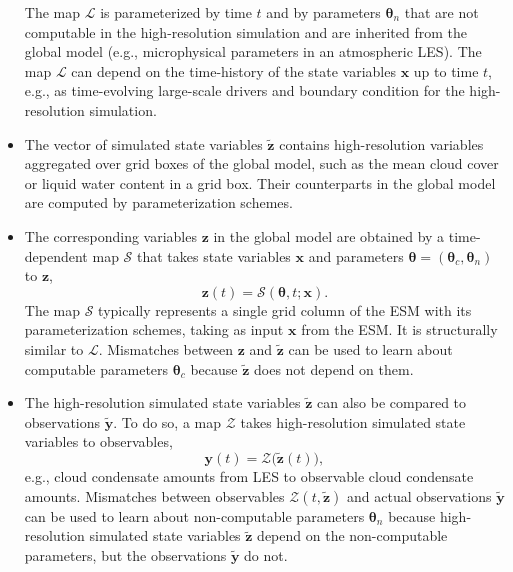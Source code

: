 \documentclass{article}
\renewcommand{\vec}[1]{\boldsymbol{{#1}}}
\begin{document}
\begin{itemize}
\begin{equation}
    \end{equation}
    The map $\mathcal{L}$ is parameterized by time $t$ and by parameters $\vec{\theta}_n$ that are not computable in the high-resolution simulation and are inherited from the global model (e.g., microphysical parameters in an atmospheric LES). The map $\mathcal{L}$ can depend on the time-history of the state variables $\vec{x}$ up to time $t$, e.g., as time-evolving large-scale drivers and boundary condition for the high-resolution simulation. 
    \item The vector of simulated state variables $\vec{\tilde z}$ contains high-resolution variables aggregated over grid boxes of the global model,  such as the mean cloud cover or liquid water content in a grid box. Their counterparts in the global model are computed by parameterization schemes.
    \item The corresponding variables $\vec{z}$ in the global model are obtained by a time-depen\-dent map $\mathcal{S}$ that takes state variables $\vec{x}$ and parameters $\vec{\theta} = (\vec{\theta}_c, \vec{\theta}_n)$ to $\vec{z}$,
    \begin{equation}
    \vec{z}(t) = \mathcal{S}(\vec{\theta},t; \vec{x}).
    \end{equation}
    The map $\mathcal{S}$ typically represents a single grid column of the ESM with its parameterization schemes, taking as input $\vec{x}$ from the ESM. It is structurally similar to $\mathcal{L}$. Mismatches between $\vec{z}$ and $\vec{\tilde z}$ can be used to learn about computable parameters $\vec{\theta}_c$ because $\vec{\tilde z}$ does not depend on them.
    \item The high-resolution simulated state variables $\vec{\tilde z}$ can also be compared to observations $\vec{\tilde y}$. To do so, a map $\mathcal{Z}$ takes high-resolution simulated state variables to observables,
    \begin{equation}
        \vec{y}(t) = \mathcal{Z}\bigl(\vec{\tilde z}(t)\bigr),
    \end{equation}
    e.g., cloud condensate amounts from LES to observable cloud condensate amounts. Mismatches between observables $\mathcal{Z}(t, \vec{\tilde z})$ and actual observations $\vec{\tilde y}$ can be used to learn about non-computable parameters $\vec{\theta}_n$ because high-resolution simulated state variables $\vec{\tilde z}$ depend on the non-computable parameters, but the observations $\vec{\tilde y}$ do not. 

\end{itemize}
\end{document}
